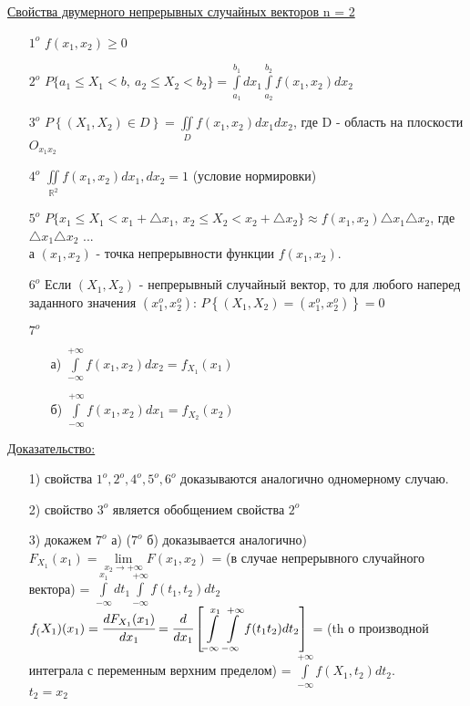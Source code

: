 \underline{Свойства двумерного непрерывных случайных векторов n = 2} 
\begin{enumerate}
\item[$1^o$] $f(x_1, x_2) \geqslant 0$ 

\item[$2^o$] $\displaystyle  P\{a_1 \leqslant X_1 < b, \ a_2 \leqslant X_2 < b_2 \} = \int\limits_{a_1}^{b_1} dx_1 \int\limits_{a_2}^{b_2} f(x_1, x_2) dx_2$

\item[$3^o$] $\displaystyle  P\left\{ (X_1, X_2) \in D \right\} = \iint\limits_{D} f(x_1, x_2) dx_1 dx_2$, где D - область на плоскости $O_{x_1 x_2}$ 

\item[$4^o$] $\displaystyle  \iint\limits_{\mathbb{R}^2} f(x_1, x_2) dx_1, dx_2 = 1$ (условие нормировки)

\item[$5^o$]  $P\{ x_1 \leqslant X_1 < x_1 + \triangle x_1, \ x_2 \leqslant X_2 < x_2 + \triangle x_2 \} \approx f(x_1, x_2) \triangle x_1 \triangle x_2$, где $\triangle x_1 \triangle x_2$ ... \\%
а $(x_1, x_2)$ - точка непрерывности функции $f(x_1, x_2)$.

\item[$6^o$] Если $(X_1, X_2)$ - непрерывный случайный вектор, то для любого наперед заданного значения $(x^o_1, x^o_2)$: $P\left\{ (X_1, X_2) = (x^o_1, x^o_2) \right\} = 0$

\item[$7^o$] 
	\begin{enumerate}
	\item[а)] $\displaystyle  \int\limits_{-\infty}^{+\infty} f(x_1, x_2) dx_2 = f_{X_1} (x_1)$ 
	\item[б)] $\displaystyle  \int\limits_{-\infty}^{+\infty}  f(x_1, x_2) dx_1 = f_{X_2} (x_2)$
	\end{enumerate}
\end{enumerate}


\underline{Доказательство:} 
\begin{enumerate}
\item[1)] свойства $1^o, 2^o, 4^o, 5^o, 6^o$ доказываются аналогично одномерному случаю.

\item[2)] свойство $3^o$ является обобщением свойства $2^o$

\item[3)] докажем $7^o$ а) ($7^o$ б) доказывается аналогично) \\
$F_{X_1} (x_1) = \lim\limits_{x_2 \to +\infty} F(x_1, x_2)$ = (в случае непрерывного случайного вектора) = $\displaystyle \int\limits_{-\infty}^{x_1} dt_1 \int\limits_{-\infty}^{+\infty} f(t_1, t_2) dt_2$ \\
$\displaystyle f_(X_1) (x_1) = \cfrac{d F_{X_1} (x_1)}{dx_1} = \cfrac{d}{dx_1} \left[ \int\limits_{-\infty}^{x_1} \int\limits_{-\infty}^{+\infty} f(t_1 t_2) dt_2 \right]$ = (th о производной интеграла с переменным верхним пределом) = $\displaystyle \int\limits_{-\infty}^{+\infty} f(X_1, t_2) dt_2$. \\
$t_2 = x_2$
\end{enumerate}


